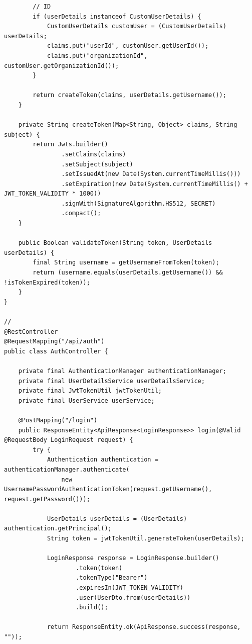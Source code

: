 \begin{verbatim}
        // ID
        if (userDetails instanceof CustomUserDetails) {
            CustomUserDetails customUser = (CustomUserDetails) userDetails;
            claims.put("userId", customUser.getUserId());
            claims.put("organizationId", customUser.getOrganizationId());
        }
        
        return createToken(claims, userDetails.getUsername());
    }
    
    private String createToken(Map<String, Object> claims, String subject) {
        return Jwts.builder()
                .setClaims(claims)
                .setSubject(subject)
                .setIssuedAt(new Date(System.currentTimeMillis()))
                .setExpiration(new Date(System.currentTimeMillis() + JWT_TOKEN_VALIDITY * 1000))
                .signWith(SignatureAlgorithm.HS512, SECRET)
                .compact();
    }
    
    public Boolean validateToken(String token, UserDetails userDetails) {
        final String username = getUsernameFromToken(token);
        return (username.equals(userDetails.getUsername()) && !isTokenExpired(token));
    }
}

// 
@RestController
@RequestMapping("/api/auth")
public class AuthController {
    
    private final AuthenticationManager authenticationManager;
    private final UserDetailsService userDetailsService;
    private final JwtTokenUtil jwtTokenUtil;
    private final UserService userService;
    
    @PostMapping("/login")
    public ResponseEntity<ApiResponse<LoginResponse>> login(@Valid @RequestBody LoginRequest request) {
        try {
            Authentication authentication = authenticationManager.authenticate(
                new UsernamePasswordAuthenticationToken(request.getUsername(), request.getPassword()));
                
            UserDetails userDetails = (UserDetails) authentication.getPrincipal();
            String token = jwtTokenUtil.generateToken(userDetails);
            
            LoginResponse response = LoginResponse.builder()
                    .token(token)
                    .tokenType("Bearer")
                    .expiresIn(JWT_TOKEN_VALIDITY)
                    .user(UserDto.from(userDetails))
                    .build();
                    
            return ResponseEntity.ok(ApiResponse.success(response, ""));
            

\end{verbatim}
